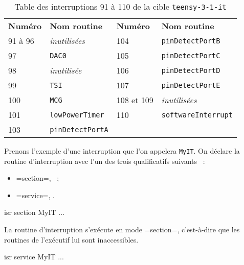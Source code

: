 \begin{table}[!t]
  \small
  \centering
  \begin{tabular}{ll|ll}
    \textbf{Numéro}& \textbf{Nom routine} & \textbf{Numéro}& \textbf{Nom routine} \\
    91 à 96  & \emph{inutilisées} &     104  & \texttt{pinDetectPortB}\\
    97  & \texttt{DAC0}  & 105  & \texttt{pinDetectPortC} \\
    98  & \emph{inutilisée} & 106  & \texttt{pinDetectPortD}\\
    99  & \texttt{TSI} & 107  & \texttt{pinDetectPortE}\\
    100  & \texttt{MCG} & 108 et 109  & \emph{inutilisées}\\
    101  & \texttt{lowPowerTimer} & 110  & \texttt{softwareInterrupt}\\
    103  & \texttt{pinDetectPortA} & &\\
  \end{tabular}
  \caption{Table des interruptions 91 à 110 de la cible \texttt{teensy-3-1-it}}
  \ligne
\end{table}



Prenons l'exemple d'une interruption que l'on appelera \texttt{MyIT}. On déclare la routine d'interruption avec l'un des trois qualificatifs suivants ~:
\begin{itemize}
  \item \plm=section=, ~;
  \item \plm=service=, .
\end{itemize}




\begin{PLM}
isr section MyIT {
  ...
}
\end{PLM}

La routine d'interruption s'exécute en mode \plm=section=, c'est-à-dire que les routines de l'exécutif lui sont inaccessibles. 




\begin{PLM}
isr service MyIT {
  ...
}
\end{PLM}

